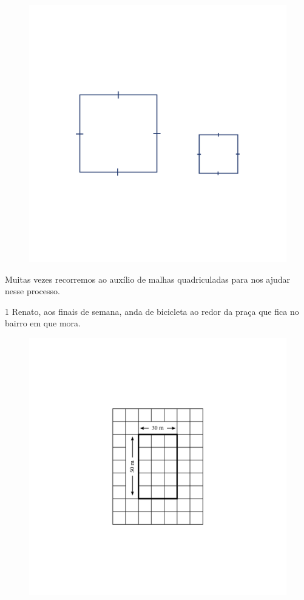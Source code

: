 {\begin{figure}[htpb!]
\includegraphics[width=\textwidth]{../ilustracoes/MAT5/SAEB_5ANO_MAT_figura34.png}
\end{figure}

Muitas vezes recorremos ao auxílio de malhas quadriculadas para nos
ajudar nesse processo.}


\num{1} Renato, aos finais de semana, anda de bicicleta ao redor da praça
que fica no bairro em que mora.

\begin{figure}[htpb!]
\includegraphics[width=\textwidth]{../ilustracoes/MAT5/SAEB_5ANO_MAT_figura35.png}
\end{figure}

